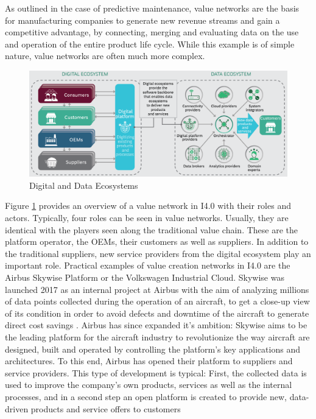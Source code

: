 As outlined in the case of predictive maintenance, value networks are the basis for manufacturing companies to generate new revenue streams and gain a competitive advantage, by connecting, merging and evaluating data on the use and operation of the entire product life cycle. While this example is of simple nature, value networks are often much more complex.

\begin{figure}[h]
\includegraphics[scale=0.35]{content/pictures/digital_ecosystems_bcg.png}
\caption{Digital and Data Ecosystems}
\label{fig:valuenetworksi40}
\end{figure}

Figure \ref{fig:valuenetworksi40} provides an overview of a value network in \ac{I4.0} with their roles and actors. Typically, four roles can be seen in value networks. Usually, they are identical with the players seen along the traditional value chain. These are the platform operator, the OEMs, their customers as well as suppliers. In addition to the traditional suppliers, new service providers from the digital ecosystem play an important role. Practical examples of value creation networks in \ac{I4.0} are the Airbus Skywise Platform or the Volkswagen Industrial Cloud. Skywise was launched 2017 as an internal project at Airbus with the aim of analyzing millions of data points collected during the operation of an aircraft, to get a close-up view of its condition in order to avoid defects and downtime of the aircraft to generate direct cost savings \cite{Hanke2019AirbusWerden}. Airbus has since expanded it's ambition: Skywise aims to be the leading platform for the aircraft industry to revolutionize the way aircraft are designed, built and operated by controlling the platform's key applications and architectures. To this end, Airbus has opened their platform to suppliers and service providers. This type of development is typical: First, the collected data is used to improve the company's own products, services as well as the internal processes, and in a second step an open platform is created to provide new,  data-driven products and service offers to customers 

